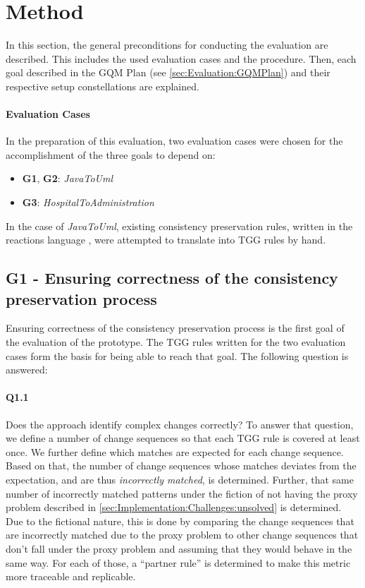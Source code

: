 \section{Method}
\label{sec:Evaluation:Design}
In this section, the general preconditions for conducting the evaluation are described. This includes the used evaluation cases and the procedure.
Then, each goal described in the GQM Plan (see \autoref{sec:Evaluation:GQMPlan}) and their respective setup constellations are explained.

\paragraph{Evaluation Cases} In the preparation of this evaluation, two evaluation cases were chosen for the accomplishment of the three goals to depend on:
\begin{itemize}
    \item \textbf{G1}, \textbf{G2}: \emph{JavaToUml} \cite{noauthor_vitruv-toolsvitruv-casestudies_nodate, chen_java-to-uml} 
    \item \textbf{G3}: \emph{HospitalToAdministration} \cite{emoflon_tutorial, noauthor_github_emoflon_tutorial}
\end{itemize}

In the case of \emph{JavaToUml}, existing consistency preservation rules, written in the reactions language \cite{kramer_specification_2017}, were attempted to translate into TGG rules by hand.

\subsection{G1 - Ensuring correctness of the consistency preservation process}
\label{sec:Evaluation:Design:G1}
Ensuring correctness of the consistency preservation process is the first goal of the evaluation of the prototype.
The TGG rules written for the two evaluation cases form the basis for being able to reach that goal.
The following question is answered:

\paragraph{Q1.1} Does the approach identify complex changes correctly?\newline
To answer that question, we define a number of change sequences so that each TGG rule is covered at least once.
We further define which matches are expected for each change sequence.
Based on that, the number of change sequences whose matches deviates from the expectation, and are thus \emph{incorrectly matched}, is determined.
Further, that same number of incorrectly matched patterns under the fiction of not having the proxy problem described in \autoref{sec:Implementation:Challenges:unsolved} is determined. Due to the fictional nature, this is done by comparing the change sequences that are incorrectly matched due to the proxy problem to other change sequences that don't fall under the proxy problem and assuming that they would behave in the same way. For each of those, a \enquote{partner rule} is determined to make this metric more traceable and replicable.

